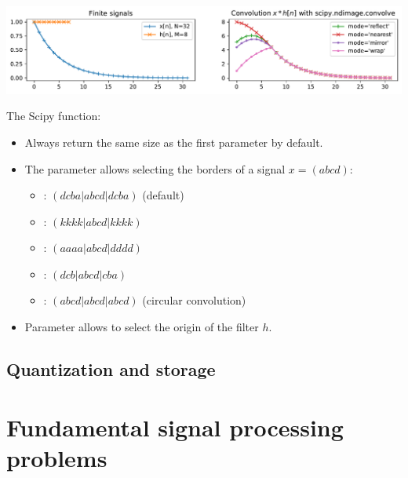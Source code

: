 \begin{center}
  \includegraphics[width=1\linewidth]{imgs/sig_conv/conv_scipy_ndimage.pdf}

\end{center}\vspace{-2mm}

\begin{block}{The Scipy   function:}\vspace{-2mm}
  \begin{itemize}
      \item Always return the same size as the first parameter by default.
      \item  The  parameter allows selecting the borders of a signal $x=(abcd)$:
      \begin{itemize}
          \item {} : $(d c b a | a b c d | d c b a)$ (default)
          \item  {} : $(k k k k | a b c d | k k k k)$
          \item {} : $(a a a a | a b c d | d d d d)$
          \item {} : $(d c b | a b c d | c b a)$
          \item {} : $(a b c d | a b c d | a b c d)$ (circular convolution)
      \end{itemize}
      \item  Parameter  allows to select the origin of the filter $h$.
  \end{itemize}
  


\end{block}


\subsection{Quantization and storage}
\label{sec:}


\section{Fundamental signal processing problems}
\label{sec:sp_prob}

